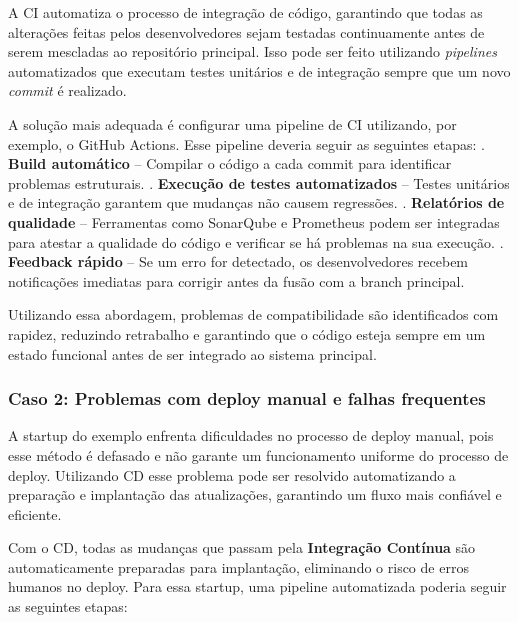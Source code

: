 \documentclass[a4paper,12pt]{article}
\begin{document}
A CI automatiza o processo de integração de código, garantindo que todas as alterações feitas pelos desenvolvedores sejam testadas continuamente antes de serem mescladas ao repositório principal. Isso pode ser feito utilizando \textit{pipelines} automatizados que executam testes unitários e de integração sempre que um novo \textit{commit} é realizado.  

A solução mais adequada é configurar uma pipeline de CI utilizando, por exemplo, o GitHub Actions. Esse pipeline deveria seguir as seguintes etapas:  . \textbf{Build automático} – Compilar o código a cada commit para identificar problemas estruturais.  . \textbf{Execução de testes automatizados} – Testes unitários e de integração garantem que mudanças não causem regressões.  . \textbf{Relatórios de qualidade} – Ferramentas como SonarQube e Prometheus podem ser integradas para atestar a qualidade do código e verificar se há problemas na sua execução.  . \textbf{Feedback rápido} – Se um erro for detectado, os desenvolvedores recebem notificações imediatas para corrigir antes da fusão com a branch principal.  \newline

Utilizando essa abordagem, problemas de compatibilidade são identificados com rapidez, reduzindo retrabalho e garantindo que o código esteja sempre em um estado funcional antes de ser integrado ao sistema principal.  

\subsubsection*{Caso 2: Problemas com deploy manual e falhas frequentes}  
A startup do exemplo enfrenta dificuldades no processo de deploy manual, pois esse método é defasado e não garante um funcionamento uniforme do processo de deploy. Utilizando CD esse problema pode ser resolvido automatizando a preparação e implantação das atualizações, garantindo um fluxo mais confiável e eficiente.  

Com o CD, todas as mudanças que passam pela \textbf{Integração Contínua} são automaticamente preparadas para implantação, eliminando o risco de erros humanos no deploy. Para essa startup, uma pipeline automatizada poderia seguir as seguintes etapas:  
\end{document}
